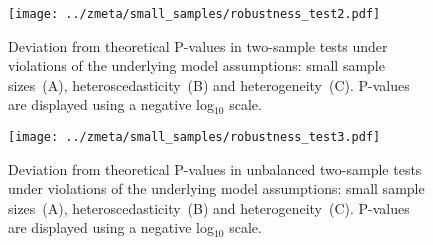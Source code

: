 \documentclass[preprint]{elsarticle}
\DeclareMathOperator{\Var}{Var}
\newcommand{\effectvector}{\hat\beta}
\newcommand{\effect}[1][i]{\effectvector_{#1}}
\newcommand{\vareffect}[1][i]{s^2_{#1}}
\newcommand{\zeffect}[1][\studyidx]{Z_{#1}}
\newcommand{\peffect}[1][\studyidx]{P_{#1}}
\newcommand{\nStudies}{k}
\newcommand{\studyidx}{i}
\newcommand{\varCombined}{\sigma^2_{C}}
\newcommand{\metaanalyticeffect}[1][i]{\gamma_{#1}}
\newcommand{\estvarBetween}{\hat\tau^2}
\newcommand{\nSubjects}[1][i]{n_{#1}}
\newcommand{\varWithinConInv}[1][i]{\nSubjects[#1] / \sigma^2_{#1}}
\begin{document}



\begin{figure}[h]
	\centering
 	\texttt{[image: ../zmeta/small\_samples/robustness\_test2.pdf]}
	\caption{Deviation from theoretical P-values in two-sample tests under violations of the underlying model assumptions: small sample sizes~(A), heteroscedasticity~(B) and heterogeneity~(C). P-values are displayed using a negative log$_{10}$ scale.}
	\label{fig:robustness_test2}
\end{figure}

\begin{figure}[h]
	\centering
 	\texttt{[image: ../zmeta/small\_samples/robustness\_test3.pdf]}
	\caption{Deviation from theoretical P-values in unbalanced two-sample tests under violations of the underlying model assumptions: small sample sizes~(A), heteroscedasticity~(B) and heterogeneity~(C). P-values are displayed using a negative log$_{10}$ scale.}
	\label{fig:robustness_test3}
\end{figure}
\end{document}
